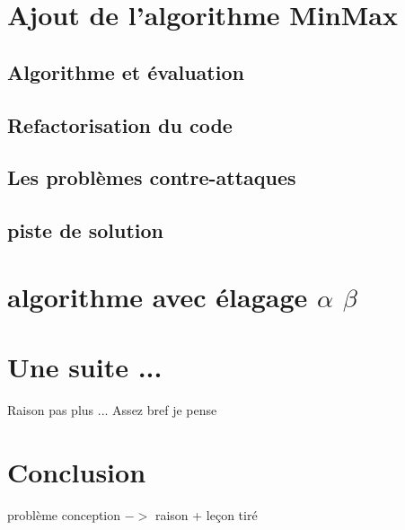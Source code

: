 \documentclass[12pt, legalpaper]{article}
\begin{document}
\newpage

\section{Ajout de l'algorithme MinMax}
\subsection{Algorithme et évaluation}
\subsection{Refactorisation du code}
\subsection{Les problèmes contre-attaques}
\subsection{piste de solution}

\newpage

\section{algorithme avec élagage $\alpha$ $\beta$ }

\newpage

\section{Une suite ...}
Raison pas plus ...
Assez bref je pense


\section{Conclusion}
problème conception $->$ raison + leçon tiré
\end{document}

